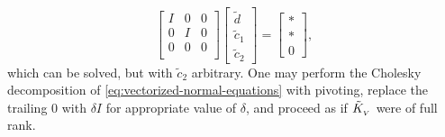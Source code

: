 \begin{equation} \label{eq:vectorized-normal-equations-cholesky-2}
\begin{bmatrix}
I & 0 & 0\\
0 & I & 0 \\
0 & 0 & 0 \\
\end{bmatrix}
\begin{bmatrix}
\tilde{d}\\
\tilde{c}_1\\
\tilde{c}_2
\end{bmatrix}
= \begin{bmatrix}
* \\
* \\
0
\end{bmatrix},
\end{equation}
\noindent
which can be solved, but with $\tilde{c}_2$ arbitrary. One may perform the Cholesky decomposition of \eqref{eq:vectorized-normal-equations} with pivoting, replace the trailing $0$ with $\delta I$ for appropriate value of $\delta$, and proceed as if $\tilde{K}_{_{\scriptscriptstyle V}}$ were of full rank. 

\bigskip


